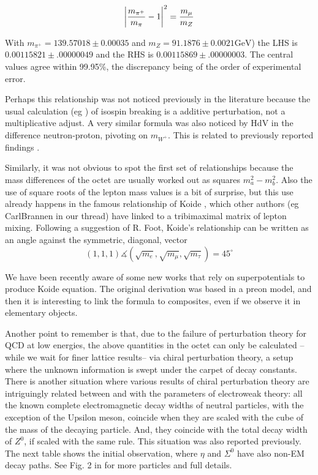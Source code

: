 \documentclass[a4paper,10pt]{article}
\begin{document}
$$
\left\vert {m_{\pi^+} \over m_\pi} -1 \right\vert^2 = { m_\mu \over m_Z}
$$

With $m_{\pi^+}=139.57018 \pm 0.00035 $ and $m_Z=91.1876 ± 0.0021 \mbox{GeV}$) 
the LHS is $  0.00115821   \pm .00000049$
and the RHS is  $0.00115869 \pm .00000003$. The central values agree within 99.95\%, the discrepancy being of the order of experimental error.

Perhaps this relationship was not noticed previously in the literature because the usual calculation (eg \cite{Witten:1983ut}) of isospin breaking is a additive perturbation, not a multiplicative adjust. A very similar formula was also noticed by HdV in the difference neutron-proton, pivoting on $m_{W^+}$. This is related to previously reported findings \cite{deVries:2005xi}.

Similarly, it was not obvious to spot the first set of relationships because the mass differences of the octet are usually worked out as squares $m_a^2 - m_b^2$. Also the use of square roots of the lepton mass values is a bit of surprise, but this use already happens in the famous relationship of Koide \cite{Koide:1983qe}, which other authors (eg CarlBrannen in our thread) have linked to a tribimaximal matrix of lepton mixing. Following a suggestion of R. Foot\cite{Foot:1994yn}, Koide's relationship can be written as an angle against the symmetric, diagonal, vector
$$
 (1,1,1) \measuredangle  (\sqrt{m_e},\sqrt{m_\mu},\sqrt{m_\tau}) = 45^\circ
$$

We have been recently aware of some new works \cite{masusy,ksusy, ksusy2} that rely on superpotentials to produce Koide equation. The original derivation was based in a preon model, and then it is interesting to link the formula to composites, even if we observe it in elementary objects.

Another point to remember is that, due to the failure of perturbation theory for QCD at low energies, the above quantities in the octet can only be calculated --while we wait for finer lattice results-- via chiral perturbation theory, a setup where the unknown information is swept under the carpet of decay constants. There is another situation where various results of chiral perturbation theory are intriguingly related between and with the parameters of electroweak theory: all the known complete electromagnetic decay widths of neutral particles, with the exception of the Upsilon meson, coincide when they are scaled with the cube of the mass of the decaying particle. And, they coincide with the total decay width of $Z^0$, if scaled with the same rule. This situation was also reported previously. The next table shows the initial observation, where $\eta$ and $\Sigma^0$ have also non-EM decay paths. See Fig. 2 in \cite{Rivero:2006rb} for more particles and full details.
\end{document}
